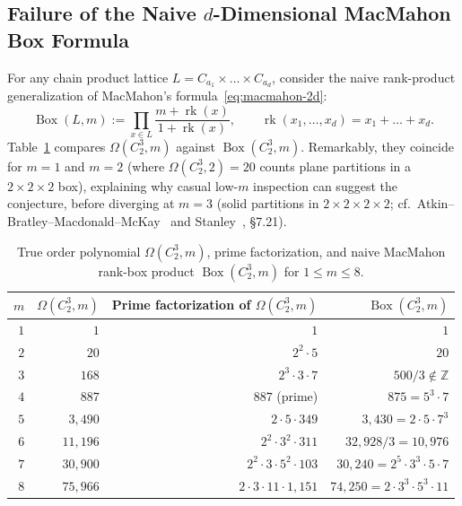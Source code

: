 \documentclass[11pt,a4paper]{article}
\newcommand{\coloneqq}{\mathrel{:=}}
\theoremstyle{definition}
\newcommand{\rk}{\operatorname{rk}}
\newcommand{\BoxProd}{\operatorname{Box}}
\begin{document}
\subsection{Failure of the Naive \texorpdfstring{$d$}{d}-Dimensional MacMahon Box Formula}

For any chain product lattice $L = C_{a_1} \times \dots \times C_{a_d}$, consider the naive
rank-product generalization of MacMahon's formula~\eqref{eq:macmahon-2d}:
\[
  \BoxProd(L, m) \coloneqq \prod_{x \in L} \frac{m + \rk(x)}{1 + \rk(x)},
  \qquad \rk(x_1, \dots, x_d) = x_1 + \dots + x_d.
\]
Table~\ref{tab:box-vs-omega} compares $\Omega(C_2^3, m)$ against $\BoxProd(C_2^3, m)$. Remarkably,
they coincide for $m = 1$ and $m = 2$ (where $\Omega(C_2^3, 2) = 20$ counts plane partitions in a
$2 \times 2 \times 2$ box), explaining why casual low-$m$ inspection can suggest the conjecture,
before diverging at $m = 3$ (solid partitions in $2 \times 2 \times 2 \times 2$; cf.\
Atkin--Bratley--Macdonald--McKay~\cite{ABMM1967} and Stanley~\cite{StanleyEC2}, \S7.21).

\begin{table}[ht]
\centering
\caption{True order polynomial $\Omega(C_2^3, m)$, prime factorization, and naive MacMahon rank-box
product $\BoxProd(C_2^3, m)$ for $1 \le m \le 8$.}\label{tab:box-vs-omega}
\smallskip
\begin{tabular}{@{}rrrr@{}}
\toprule
$m$ & $\Omega(C_2^3, m)$ & Prime factorization of $\Omega(C_2^3, m)$ & $\BoxProd(C_2^3, m)$ \\
\midrule
$1$ & $1$       & $1$                                & $1$ \\
$2$ & $20$      & $2^2 \cdot 5$                      & $20$ \\
$3$ & $168$     & $2^3 \cdot 3 \cdot 7$              & $500/3 \notin \mathbb{Z}$ \\
$4$ & $887$     & $887$ (prime)                      & $875 = 5^3 \cdot 7$ \\
$5$ & $3{,}490$ & $2 \cdot 5 \cdot 349$              & $3{,}430 = 2 \cdot 5 \cdot 7^3$ \\
$6$ & $11{,}196$& $2^2 \cdot 3^2 \cdot 311$          & $32{,}928/3 = 10{,}976$ \\
$7$ & $30{,}900$& $2^2 \cdot 3 \cdot 5^2 \cdot 103$  & $30{,}240 = 2^5 \cdot 3^3 \cdot 5 \cdot 7$ \\
$8$ & $75{,}966$& $2 \cdot 3 \cdot 11 \cdot 1{,}151$ & $74{,}250 = 2 \cdot 3^3 \cdot 5^3 \cdot 11$ \\
\bottomrule
\end{tabular}
\end{table}
\end{document}
